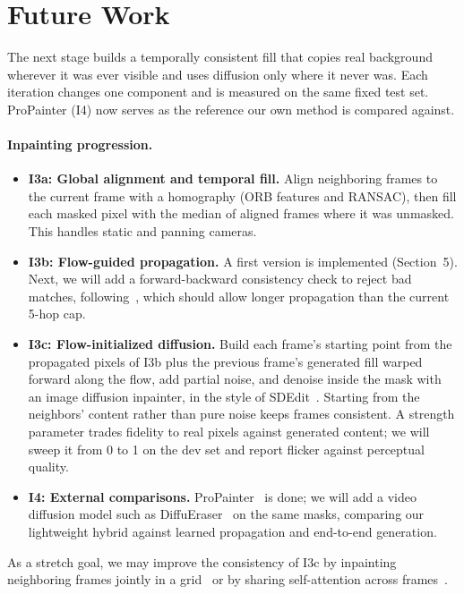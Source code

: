 \documentclass[11pt]{article}
\begin{document}
\section{Future Work}\label{sec:future}
The next stage builds a temporally consistent fill that copies real background wherever it was ever visible and uses diffusion only where it never was. Each iteration changes one component and is measured on the same fixed test set. ProPainter (I4) now serves as the reference our own method is compared against.

\paragraph{Inpainting progression.}
\begin{itemize}
  \item \textbf{I3a: Global alignment and temporal fill.} Align neighboring frames to the current frame with a homography (ORB features and RANSAC), then fill each masked pixel with the median of aligned frames where it was unmasked. This handles static and panning cameras.
  \item \textbf{I3b: Flow-guided propagation.} A first version is implemented (Section~5). Next, we will add a forward-backward consistency check to reject bad matches, following~\cite{xu2019deep,gao2020flow}, which should allow longer propagation than the current 5-hop cap.
  \item \textbf{I3c: Flow-initialized diffusion.} Build each frame's starting point from the propagated pixels of I3b plus the previous frame's generated fill warped forward along the flow, add partial noise, and denoise inside the mask with an image diffusion inpainter, in the style of SDEdit~\cite{meng2022sdedit}. Starting from the neighbors' content rather than pure noise keeps frames consistent. A strength parameter trades fidelity to real pixels against generated content; we will sweep it from 0 to 1 on the dev set and report flicker against perceptual quality.
  \item \textbf{I4: External comparisons.} ProPainter~\cite{zhou2023propainter} is done; we will add a video diffusion model such as DiffuEraser~\cite{li2025diffueraser} on the same masks, comparing our lightweight hybrid against learned propagation and end-to-end generation.
\end{itemize}
As a stretch goal, we may improve the consistency of I3c by inpainting neighboring frames jointly in a grid~\cite{kara2024rave} or by sharing self-attention across frames~\cite{khachatryan2023text2video}.
\end{document}
